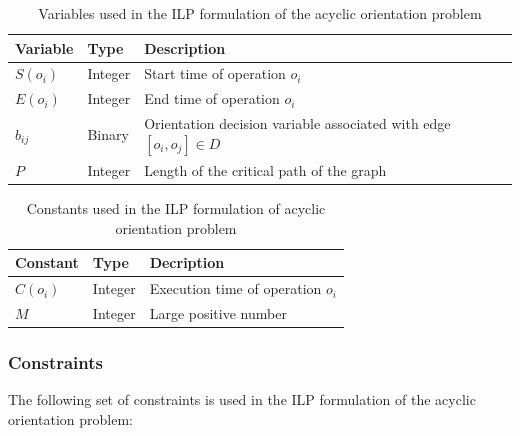 \begin{table}[!htbp]
\caption{Variables used in the ILP formulation of the acyclic orientation problem}
\centering
\label{table:varilporient}
\begin{tabular}{l l l}
\toprule
Variable & Type & Description  \\
\midrule
 $S(o_i)$ & Integer & Start time of operation $o_i$\\
 $E(o_i)$ & Integer & End time of operation $o_i$\\
 $b_{ij}$ & Binary & Orientation decision variable associated with edge $[o_i,o_j] \in D$\\
 $P$ & Integer & Length of the critical path of the graph\\
\bottomrule
\end{tabular}
\end{table}

\begin{table}[!htbp]
\caption{Constants used in the ILP formulation of acyclic orientation problem}
\centering
\label{table:consilporient}
\begin{tabular}{l l l}
\toprule
Constant & Type & Decription\\
\midrule
 $C(o_i)$ & Integer & Execution time of operation $o_i$\\
 $M$ & Integer & Large positive number\\
\bottomrule
\end{tabular}
\end{table}

\subsubsection{Constraints}

The following set of constraints is used in the ILP formulation of the acyclic orientation problem:

